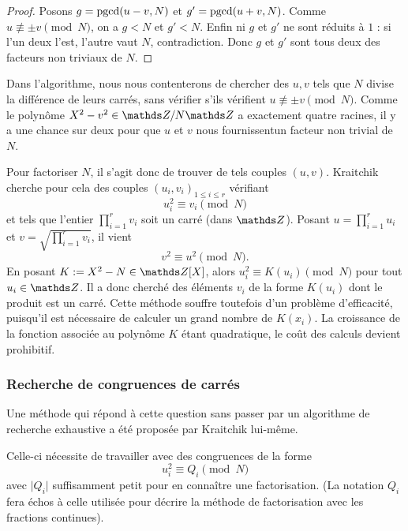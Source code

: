 \begin{proof}
	Posons $g =\operatorname{pgcd}(u-v, N)$ et $g' = \operatorname{pgcd}(u+v, N)$. Comme $u\not\equiv \pm
	v\pmod{N}$, on a $g<N$ et $g'<N$. Enfin ni $g$ et $g'$ ne sont réduits à
	$1$ : si l'un deux l'est, l'autre vaut $N$, contradiction. Donc $g$ et $g'$
	sont tous deux des facteurs non triviaux de $N$.
\end{proof}

\begin{remarque}
	Dans l'algorithme, nous nous contenterons de chercher des $u, v$ tels que
	$N$ divise la différence de leurs carrés, sans vérifier s'ils vérifient $u
	\not\equiv \pm v\pmod{N}$. Comme le polynôme $X^2 - v^2 \in \Z/N\Z$ a
	exactement quatre racines, il y a \og{} une chance sur deux \fg  pour que
	$u$ et $v$ nous fournissentun facteur non trivial de $N$. \\
\end{remarque}

Pour factoriser $N$, il s'agit donc de trouver de tels couples $(u, v)$.
Kraitchik cherche pour cela des couples $(u_i, v_i)_{1\leq i \leq r}$ vérifiant
\[u_i^2 \equiv v_i \pmod{N}\] et tels que l'entier $\prod_{i=1}^r v_i$ soit un
carré (dans $\Z$). Posant $u = \prod_{i=1}^r u_i$ et $v = \sqrt{\prod_{i=1}^r
v_i}$, il vient \[v^2\equiv u^2 \pmod{N}.\] En posant $K := X^2 - N \in \Z[X]$,
alors $u_i^2 \equiv K(u_i) \pmod{N}$ pour tout $u_i\in \Z$.  Il a donc cherché
des éléments $v_i$ de la forme $K(u_i)$ dont le produit est un carré. Cette
méthode souffre toutefois d'un problème d'efficacité, puisqu'il est nécessaire
de calculer un grand nombre de $K(x_i)$. La croissance de la fonction associée
au polynôme $K$ étant quadratique, le coût des calculs devient prohibitif.


\subsubsection{Recherche de congruences de carrés}

Une méthode qui répond à cette question sans passer par un algorithme de recherche
exhaustive a été proposée par Kraitchik lui-même. \\ 


Celle-ci nécessite de travailler avec des congruences de la forme 
\[u_i^2 \equiv Q_i \pmod{N}\] avec $\lvert Q_i \rvert$ suffisamment petit pour 
en connaître une factorisation. (La notation $Q_i$ fera échos à celle utilisée 
pour décrire la méthode de factorisation avec les fractions continues). \\


